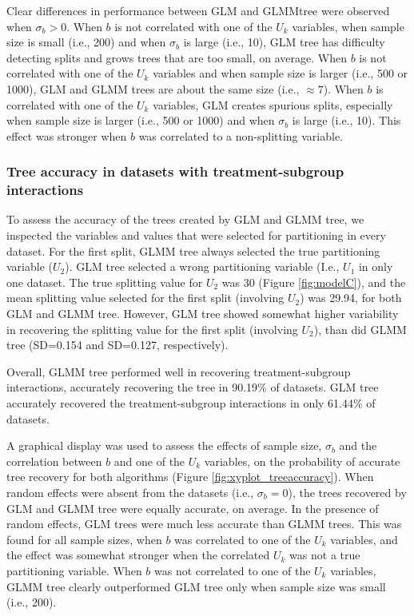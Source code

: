\documentclass[nobf,doc]{apa}
\begin{document}
Clear differences in performance between GLM and GLMMtree were observed when $\sigma_b > 0$. When $b$ is not correlated with one of the $U_k$ variables, when sample size is small (i.e., 200) and when $\sigma_b$ is large (i.e., 10), GLM tree has difficulty detecting splits and grows trees that are too small, on average. When $b$ is not correlated with one of the $U_k$ variables and when sample size is larger (i.e., 500 or 1000), GLM and GLMM trees are about the same size (i.e., $\approx 7$). When $b$ is correlated with one of the $U_k$ variables, GLM creates spurious splits, especially when sample size is larger (i.e., 500 or 1000) and when $\sigma_b$ is large (i.e., 10). This effect was stronger when $b$ was correlated to a non-splitting variable. 


 
\subsubsection{Tree accuracy in datasets with treatment-subgroup interactions}

To assess the accuracy of the trees created by GLM and GLMM tree, we inspected the variables and values that were selected for partitioning in every dataset. For the first split, GLMM tree always selected the true partitioning variable ($U_2$). GLM tree selected a wrong partitioning variable (I.e., $U_1$ in only one dataset. The true splitting value for $U_2$ was 30 (Figure \ref{fig:modelC}), and the mean splitting value selected for the first split (involving $U_2$) was 29.94, for both GLM and GLMM tree. However, GLM tree showed somewhat higher variability in recovering the splitting value for the first split (involving $U_2$), than did GLMM tree (SD=0.154 and SD=0.127, respectively).

Overall, GLMM tree performed well in recovering treatment-subgroup interactions, accurately recovering the tree in 90.19\% of datasets. GLM tree accurately recovered the treatment-subgroup interactions in only 61.44\% of datasets. 

A graphical display was used to assess the effects of sample size, $\sigma_b$ and the correlation between $b$ and one of the $U_k$ variables, on the probability of accurate tree recovery for both algorithms (Figure \ref{fig:xyplot_treeaccuracy}). When random effects were absent from the datasets (i.e., $\sigma_b = 0$), the trees recovered by GLM and GLMM tree were equally accurate, on average. In the presence of random effects, GLM trees were much less accurate than GLMM trees. This was found for all sample sizes, when $b$ was correlated to one of the $U_k$ variables, and the effect was somewhat stronger when the correlated $U_k$ was not a true partitioning variable. When $b$ was not correlated to one of the $U_k$ variables, GLMM tree clearly outperformed GLM tree only when sample size was small (i.e., 200).
\end{document}

